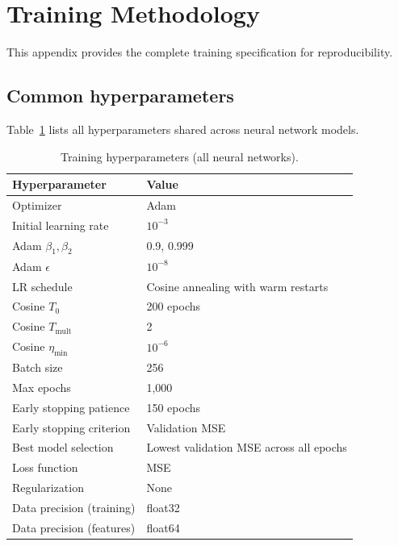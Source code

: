 \section{Training Methodology}
\label{sec:appendix_training}

This appendix provides the complete training specification for reproducibility.

\subsection{Common hyperparameters}

Table~\ref{tab:hyperparams} lists all hyperparameters shared across neural network models.

\begin{table}[htbp]
\centering
\caption{Training hyperparameters (all neural networks).}
\label{tab:hyperparams}
\begin{tabular}{ll}
\toprule
Hyperparameter & Value \\
\midrule
Optimizer                & Adam \citep{Kingma2015} \\
Initial learning rate    & $10^{-3}$ \\
Adam $\beta_1, \beta_2$  & 0.9, 0.999 \\
Adam $\epsilon$          & $10^{-8}$ \\
LR schedule              & Cosine annealing with warm restarts \\
Cosine $T_0$             & 200 epochs \\
Cosine $T_{\mathrm{mult}}$ & 2 \\
Cosine $\eta_{\min}$     & $10^{-6}$ \\
Batch size               & 256 \\
Max epochs               & 1{,}000 \\
Early stopping patience  & 150 epochs \\
Early stopping criterion & Validation MSE \\
Best model selection     & Lowest validation MSE across all epochs \\
Loss function            & MSE \\
Regularization           & None \\
Data precision (training)    & float32 \\
Data precision (features)    & float64 \\
\bottomrule
\end{tabular}
\end{table}

